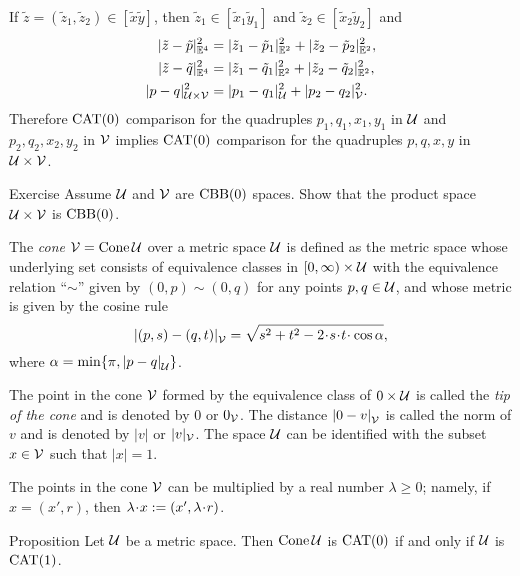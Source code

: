 If $\tilde z=(\tilde z_1,\tilde z_2)\in [\tilde x\tilde y]$, then $\tilde z_1\in [\tilde x_1\tilde y_1]$ and $\tilde z_2\in [\tilde x_2\tilde y_2]$ and
\begin{align*}
\dist[2]{\tilde z}{\tilde p}{\EE^4}&=\dist[2]{\tilde z_1}{\tilde p_1}{\EE^2}+\dist[2]{\tilde z_2}{\tilde p_2}{\EE^2},
\\
\dist[2]{\tilde z}{\tilde q}{\EE^4}&=\dist[2]{\tilde z_1}{\tilde q_1}{\EE^2}+\dist[2]{\tilde z_2}{\tilde q_2}{\EE^2},
\\
\dist[2]{p}{q}{\spc{U}\times\spc{V}}&=\dist[2]{p_1}{q_1}{\spc{U}}+\dist[2]{p_2}{q_2}{\spc{V}}.
\end{align*}
Therefore $\mathrm{CAT}(0)$ comparison for the quadruples $p_1,q_1,x_1,y_1$ in $\mathcal{U}$
and 
$p_2,q_2,x_2,y_2$ in $\mathcal{V}$ implies 
$\mathrm{CAT}(0)$ comparison for the quadruples $p,q,x,y$ in $\mathcal{U}\times \mathcal{V}$.
\qeds

\begin{thm}{Exercise}\label{ex:product-CBB}
Assume $\mathcal{U}$ and $\mathcal{V}$ are $\mathrm{CBB}(0)$ spaces.
Show that the product space $\mathcal{U}\times\mathcal{V}$ is $\mathrm{CBB}(0)$.
\end{thm}

The \label{page:cone}\emph{cone} $\mathcal{V}=\mathop{\rm Cone}\nolimits\mathcal{U}$ over a metric space $\mathcal{U}$
is defined as the metric space whose underlying set consists of
equivalence classes in
$[0,\infty)\times \mathcal{U}$ with the equivalence relation ``$\sim$'' given by $(0,p)\sim (0,q)$ for any points $p,q\in\mathcal{U}$,
and whose metric is given by the cosine rule
\[
\dist{(p,s)}{(q,t)}{\spc{V}} 
=
\sqrt{s^2+t^2-2\cdot s\cdot t\cdot \cos\alpha},
\]
where $\alpha= \min\{\pi, \dist{p}{q}{\spc{U}}\}$.

The point in the cone $\mathcal{V}$ formed by the equivalence class of $0\times\mathcal{U}$ is called the \emph{tip of the cone} and is denoted by $0$ or $0_{\mathcal{V}}$.
The distance $\dist{0}{v}{\spc{V}}$ is called the norm of $v$ and is denoted by $|v|$ or $|v|_{\mathcal{V}}$.
The space $\mathcal{U}$ can be identified with the subset $x\in \mathcal{V}$ such that $|x|=1$.

The points in the cone $\mathcal{V}$ can be multiplied by a real number $\lambda\ge 0$;
namely, if $x=(x',r)$, then $\lambda\cdot x\df(x',\lambda\cdot r)$.



\begin{thm}{Proposition}\label{ex:cone+susp}
Let $\mathcal{U}$ be a metric space.
Then $\mathop{\rm Cone}\nolimits\mathcal{U}$ is  $\mathrm{CAT}(0)$ if and only if $\mathcal{U}$ is $\mathrm{CAT}(1)$.
\end{thm}

